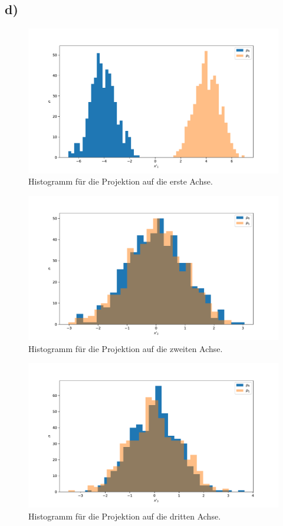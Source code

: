 \documentclass[a4paper, 11pt]{article}
\begin{document}
\subsection*{d)}
\begin{figure}
    \centering
    \includegraphics[width=\textwidth]{../A18/A18_hist_1.pdf}
    \caption{Histogramm für die Projektion auf die erste Achse.}
    \label{fig:A18_hist_1}
\end{figure}
\begin{figure}
    \centering
    \includegraphics[width=\textwidth]{../A18/A18_hist_2.pdf}
    \caption{Histogramm für die Projektion auf die zweiten Achse.}
    \label{fig:A18_hist_2}
\end{figure}
\begin{figure}
    \centering
    \includegraphics[width=\textwidth]{../A18/A18_hist_3.pdf}
    \caption{Histogramm für die Projektion auf die dritten Achse.}
    \label{fig:A18_hist_3}
\end{figure}
\end{document}

